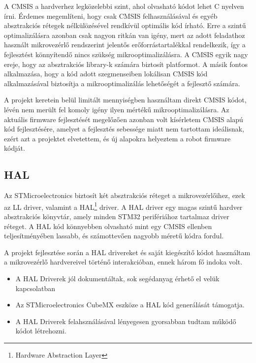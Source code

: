 
A CMSIS a hardverhez legközelebbi szint, ahol olvasható kódot lehet C nyelven
írni. Érdemes megemlíteni, hogy csak CMSIS felhasználásával és egyéb absztrakciós
rétegek nélkülözésével rendkívül optimális kód írható. Erre a szintű
optimalizálásra azonban csak nagyon ritkán van igény, mert az adott feladathoz
használt mikrovezérlő rendszerint jelentős erőforrástartalékkal rendelkezik, így
a fejlesztést könnyítendő nincs szükség mikrooptimalizálásra. A CMSIS egyik nagy ereje,
hogy az absztrakciós library-k számára biztosít platformot. A másik fontos
alkalmazása, hogy a kód adott szegmenseiben lokálisan CMSIS kód alkalmazásával
biztosítja a mikrooptimalizálás lehetőségét a fejlesztő számára.

\medskip

A projekt keretein belül limitált mennyiségben használtam direkt CMSIS kódot,
lévén nem merült fel komoly igény ilyen mértékű mikrooptimalizálásra. Az aktuális
firmware fejlesztését megelőzően azonban volt kísérletem CMSIS alapú kód
fejlesztésére, amelyet a fejlesztés sebessége miatt nem tartottam ideálisnak,
ezért azt a projektet elvetettem, és új alapokra helyeztem a robot firmware
kódját.

\subsection{HAL}

Az STMicroelectronics biztosít két absztrakciós réteget a mikrovezérlőihez, ezek
az LL driver, valamint a HAL\footnote{Hardware Abstraction Layer} driver. A HAL
driver egy magas szintű hardver absztrakciós könyvtár, amely minden STM32
perifériához tartalmaz driver réteget. A HAL kód könnyebben olvasható mint egy
CMSIS ellenben teljesítményében lassabb, és számottevően nagyobb méretű kódra
fordul.

A projekt fejlesztése során a HAL drivereket és saját kiegészítő kódot használtam
a mikrovezérlő hardvereivel történő interakcióban, ennek három fő indoka volt.

\begin{itemize}
\item{A HAL Driverek jól dokumentáltak, sok segédanyag érhető el velük
  kapcsolatban}
\item{Az STMicroelectronics CubeMX eszköze a HAL kód generálását támogatja.}
\item{A HAL Driverek felahsználásával lényegesen gyorsabban tudtam működő kódot
  létrehozni.}
\end{itemize}

